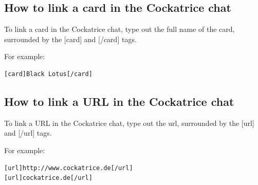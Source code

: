 \documentclass[a4paper]{scrbook}
\begin{document}
\subsection{How to link a card in the Cockatrice chat}
To link a card in the Cockatrice chat, type out the full name of the card, surrounded by the [card] and [/card] tags.

For example:
\begin{verbatim}
[card]Black Lotus[/card]
\end{verbatim}

\subsection{How to link a URL in the Cockatrice chat}
To link a URL in the Cockatrice chat, type out the url, surrounded by the [url] and [/url] tags.

For example:
\begin{verbatim}
[url]http://www.cockatrice.de[/url]
[url]cockatrice.de[/url]
\end{verbatim}

\end{document}
